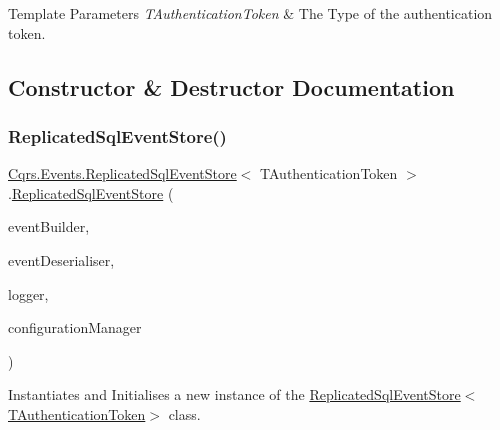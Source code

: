 \begin{DoxyTemplParams}{Template Parameters}
{\em T\+Authentication\+Token} & The Type of the authentication token.\\
\hline
\end{DoxyTemplParams}


\subsection{Constructor \& Destructor Documentation}
\mbox{\label{classCqrs_1_1Events_1_1ReplicatedSqlEventStore_aac9c247dd70c4775cf02f2ad172cd927_aac9c247dd70c4775cf02f2ad172cd927}} 
\subsubsection{\texorpdfstring{Replicated\+Sql\+Event\+Store()}{ReplicatedSqlEventStore()}}
{\footnotesize\ttfamily \hyperlink{classCqrs_1_1Events_1_1ReplicatedSqlEventStore}{Cqrs.\+Events.\+Replicated\+Sql\+Event\+Store}$<$ T\+Authentication\+Token $>$.\hyperlink{classCqrs_1_1Events_1_1ReplicatedSqlEventStore}{Replicated\+Sql\+Event\+Store} (\begin{DoxyParamCaption}\item[{\hyperlink{interfaceCqrs_1_1Events_1_1IEventBuilder}{I\+Event\+Builder}$<$ T\+Authentication\+Token $>$}]{event\+Builder,  }\item[{\hyperlink{interfaceCqrs_1_1Events_1_1IEventDeserialiser}{I\+Event\+Deserialiser}$<$ T\+Authentication\+Token $>$}]{event\+Deserialiser,  }\item[{I\+Logger}]{logger,  }\item[{\hyperlink{interfaceCqrs_1_1Configuration_1_1IConfigurationManager}{I\+Configuration\+Manager}}]{configuration\+Manager }\end{DoxyParamCaption})}



Instantiates and Initialises a new instance of the \hyperlink{classCqrs_1_1Events_1_1ReplicatedSqlEventStore_aac9c247dd70c4775cf02f2ad172cd927_aac9c247dd70c4775cf02f2ad172cd927}{Replicated\+Sql\+Event\+Store$<$\+T\+Authentication\+Token$>$} class. 



